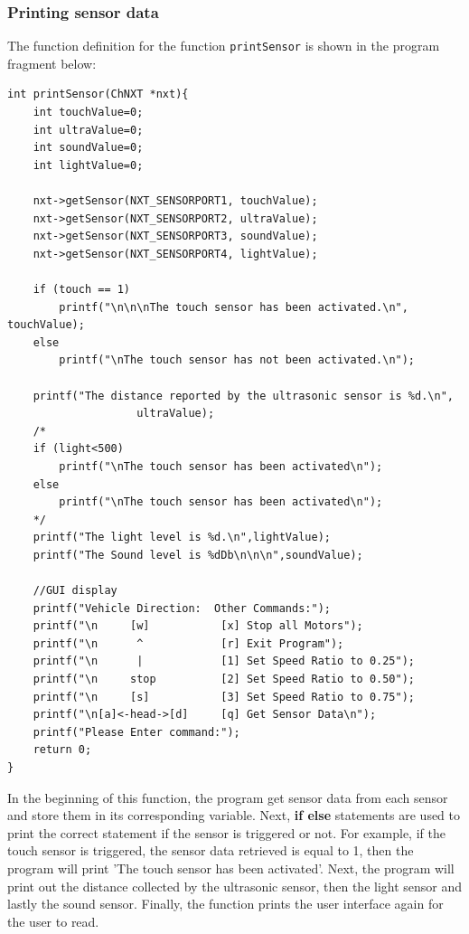 \documentclass[11pt]{article}
\begin{document}
\subsubsection*{Printing sensor data}
The function definition for the function {\tt printSensor} is shown in the program 
fragment below:
\begin{lstlisting}
int printSensor(ChNXT *nxt){
    int touchValue=0;
    int ultraValue=0;
    int soundValue=0;
    int lightValue=0;

    nxt->getSensor(NXT_SENSORPORT1, touchValue);
    nxt->getSensor(NXT_SENSORPORT2, ultraValue);
    nxt->getSensor(NXT_SENSORPORT3, soundValue);
    nxt->getSensor(NXT_SENSORPORT4, lightValue);

    if (touch == 1)
        printf("\n\n\nThe touch sensor has been activated.\n", touchValue);
    else
        printf("\nThe touch sensor has not been activated.\n");

    printf("The distance reported by the ultrasonic sensor is %d.\n",
                    ultraValue);
    /*
    if (light<500)  
        printf("\nThe touch sensor has been activated\n");
    else    
        printf("\nThe touch sensor has been activated\n");
    */
    printf("The light level is %d.\n",lightValue);
    printf("The Sound level is %dDb\n\n\n",soundValue);
    
    //GUI display
    printf("Vehicle Direction:  Other Commands:");
    printf("\n     [w]           [x] Stop all Motors");
    printf("\n      ^            [r] Exit Program");
    printf("\n      |            [1] Set Speed Ratio to 0.25");
    printf("\n     stop          [2] Set Speed Ratio to 0.50");
    printf("\n     [s]           [3] Set Speed Ratio to 0.75");
    printf("\n[a]<-head->[d]     [q] Get Sensor Data\n");
    printf("Please Enter command:");
    return 0;
}
\end{lstlisting}
In the beginning of this function, the program get sensor data from each sensor 
and store them in its corresponding variable. Next, {\bf if else} statements 
are used to print the correct statement if the sensor is triggered or not. For 
example, if the touch sensor is triggered, the sensor data retrieved is equal to
1, then the program will print 'The touch sensor has been activated'. Next, 
the program will print out the distance collected by the ultrasonic sensor, then 
the light sensor and lastly the sound sensor. Finally, the function prints the 
user interface again for the user to read.

\newpage
\appendix


\end{document}
